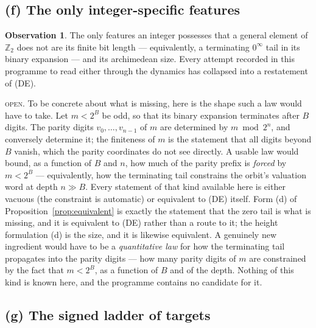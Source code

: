\documentclass[11pt,reqno]{amsart}
\theoremstyle{plain}
\theoremstyle{definition}
\newtheorem{observation}[theorem]{Observation}
\newcommand{\Zt}{\mathbb{Z}_2}
\newcommand{\lab}[1]{\textnormal{\textsc{\small #1}}}
\begin{document}
\subsection*{(f) The only integer-specific features}

\begin{observation}\label{obs:integer}
The only features an integer possesses that a general element of $\Zt$ does not
are its finite bit length --- equivalently, a terminating $0^{\infty}$ tail in its
binary expansion --- and its archimedean size. Every attempt recorded in this
programme to read either through the dynamics has collapsed into a restatement of
\textup{(DE)}.
\end{observation}
\lab{open}. To be concrete about what is missing, here is the shape such a law
would have to take. Let $m<2^{B}$ be odd, so that its binary expansion terminates
after $B$ digits. The parity digits $v_0,\dots,v_{n-1}$ of $m$ are determined by
$m \bmod 2^{n}$, and conversely determine it; the finiteness of $m$ is the
statement that all digits beyond $B$ vanish, which the parity coordinates do not
see directly. A usable law would bound, as a function of $B$ and $n$, how much of
the parity prefix is \emph{forced} by $m<2^{B}$ --- equivalently, how the
terminating tail constrains the orbit's valuation word at depth $n\gg B$. Every
statement of that kind available here is either vacuous (the constraint is
automatic) or equivalent to (DE) itself.
Form (d) of Proposition~\ref{prop:equivalent} is exactly the statement
that the zero tail is what is missing, and it is equivalent to (DE) rather than a
route to it; the height formulation (d) is the size, and it is likewise
equivalent. A genuinely new ingredient would have to be a \emph{quantitative law}
for how the terminating tail propagates into the parity digits --- how many
parity digits of $m$ are constrained by the fact that $m<2^{B}$, as a function of
$B$ and of the depth. Nothing of this kind is known here, and the programme
contains no candidate for it.

\subsection*{(g) The signed ladder of targets}
\end{document}
